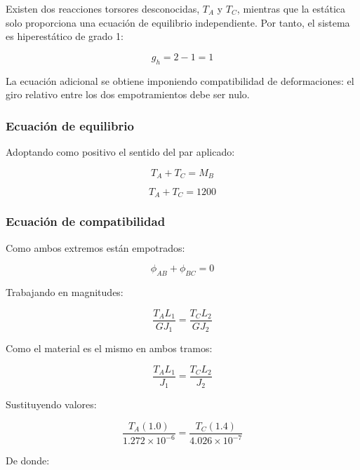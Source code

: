 \documentclass[12pt,a4paper]{article}
\begin{document}
\begin{enumerate}
Existen dos reacciones torsores desconocidas, $T_A$ y $T_C$, mientras que la estática solo proporciona una ecuación de equilibrio independiente. Por tanto, el sistema es hiperestático de grado 1:

\begin{equation}
g_h = 2 - 1 = 1
\end{equation}

La ecuación adicional se obtiene imponiendo compatibilidad de deformaciones: el giro relativo entre los dos empotramientos debe ser nulo.

\subsubsection*{Ecuación de equilibrio}

Adoptando como positivo el sentido del par aplicado:

\begin{equation}
T_A + T_C = M_B
\end{equation}

\begin{equation}
T_A + T_C = 1200
\end{equation}

\subsubsection*{Ecuación de compatibilidad}

Como ambos extremos están empotrados:

\begin{equation}
\phi_{AB} + \phi_{BC} = 0
\end{equation}

Trabajando en magnitudes:

\begin{equation}
\frac{T_A L_1}{GJ_1} = \frac{T_C L_2}{GJ_2}
\end{equation}

Como el material es el mismo en ambos tramos:

\begin{equation}
\frac{T_A L_1}{J_1} = \frac{T_C L_2}{J_2}
\end{equation}

Sustituyendo valores:

\begin{equation}
\frac{T_A(1.0)}{1.272\times10^{-6}}=
\frac{T_C(1.4)}{4.026\times10^{-7}}
\end{equation}

De donde:


\end{enumerate}
\end{document}
